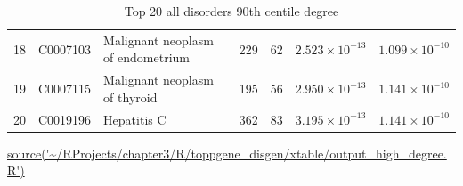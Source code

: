 \begin{table}[ht]
\begin{adjustbox}{width=\textwidth}
\begin{tabular}{lllllll}
  18 & C0007103 & Malignant neoplasm of endometrium & 229 & 62 & $2.523 \times 10^{-13}$ & $1.099 \times 10^{-10}$ \\ 
  19 & C0007115 & Malignant neoplasm of thyroid & 195 & 56 & $2.950 \times 10^{-13}$ & $1.141 \times 10^{-10}$ \\ 
  20 & C0019196 & Hepatitis C & 362 & 83 & $3.195 \times 10^{-13}$ & $1.141 \times 10^{-10}$ \\ 
   \hline
\end{tabular}
\end{adjustbox}
\caption{Top 20 all disorders 90th centile degree} 
\label{tab:overrepresentation all disorders by degree}
\tiny\url{source('~/RProjects/chapter3/R/toppgene_disgen/xtable/output_high_degree.R')}
\end{table}

